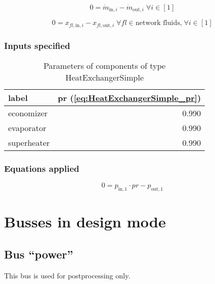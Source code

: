 \begin{equation}
\label{eq:HeatExchangerSimple_mass_flow_constraints}
0=\dot{m}_{\mathrm{in,}i}-\dot{m}_{\mathrm{out,}i}\; \forall i \in [1]
\end{equation}

\begin{equation}
\label{eq:HeatExchangerSimple_fluid_constraints}
0=x_{fl\mathrm{,in,}i}-x_{fl\mathrm{,out,}i}\;\forall fl \in\text{network fluids,}\; \forall i \in [1]
\end{equation}


\subsubsection{Inputs specified}

\begin{table}[H]\begin{center}
\begin{tabular}{lr}
\toprule
       label &  pr (\ref{eq:HeatExchangerSimple_pr}) \\
\midrule
  economizer &                                 0.990 \\
  evaporator &                                 0.990 \\
 superheater &                                 0.990 \\
\bottomrule
\end{tabular}
\caption{Parameters of components of type HeatExchangerSimple}
\end{center}\end{table}

\subsubsection{Equations applied}

\begin{equation}
\label{eq:HeatExchangerSimple_pr}
0=p_\mathrm{in,1}\cdot pr - p_\mathrm{out,1}
\end{equation}


\section{Busses in design mode}

\subsection{Bus ``power''}

This bus is used for postprocessing only.


